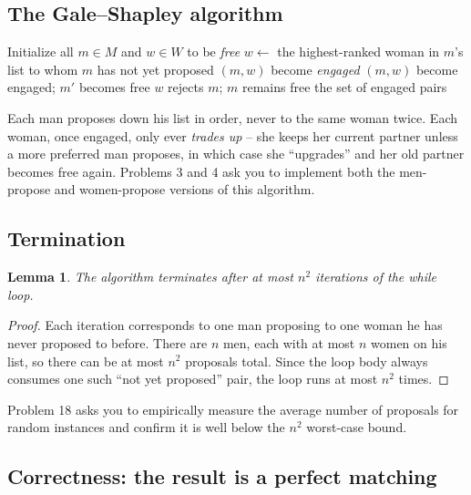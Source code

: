 \documentclass[11pt]{article}
\newtheorem{lemma}[theorem]{Lemma}
\begin{document}
\subsection{The Gale--Shapley algorithm}

\begin{algorithm}[h]
\caption{Gale--Shapley (men propose)}
\begin{algorithmic}[1]
\State Initialize all $m \in M$ and $w \in W$ to be \emph{free}
    \State $w \gets$ the highest-ranked woman in $m$'s list to whom $m$ has not yet proposed
        \State $(m, w)$ become \emph{engaged}
        \State $(m, w)$ become engaged; $m'$ becomes free
    \Else
        \State $w$ rejects $m$; $m$ remains free
    \EndIf
\EndWhile
\State \Return the set of engaged pairs
\end{algorithmic}
\end{algorithm}

Each man proposes down his list in order, never to the same woman twice. Each woman, once
engaged, only ever \emph{trades up} -- she keeps her current partner unless a more
preferred man proposes, in which case she ``upgrades'' and her old partner becomes free
again. Problems 3 and 4 ask you to implement both the men-propose and women-propose
versions of this algorithm.

\subsection{Termination}

\begin{lemma}
The algorithm terminates after at most $n^2$ iterations of the while loop.
\end{lemma}
\begin{proof}
Each iteration corresponds to one man proposing to one woman he has never proposed to
before. There are $n$ men, each with at most $n$ women on his list, so there can be at
most $n^2$ proposals total. Since the loop body always consumes one such ``not yet
proposed'' pair, the loop runs at most $n^2$ times.
\end{proof}

Problem 18 asks you to empirically measure the average number of proposals for random
instances and confirm it is well below the $n^2$ worst-case bound.

\subsection{Correctness: the result is a perfect matching}
\end{document}
